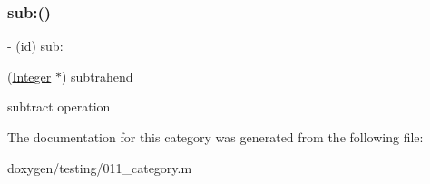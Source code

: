 \subsubsection{\texorpdfstring{sub:()}{sub:()}}
{\footnotesize\ttfamily -\/ (id) sub\+: \begin{DoxyParamCaption}\item[{(\mbox{\hyperlink{interface_integer}{Integer}} $\ast$)}]{subtrahend }\end{DoxyParamCaption}}

subtract operation 

The documentation for this category was generated from the following file\+:\begin{DoxyCompactItemize}
\item 
doxygen/testing/011\+\_\+category.\+m\end{DoxyCompactItemize}
